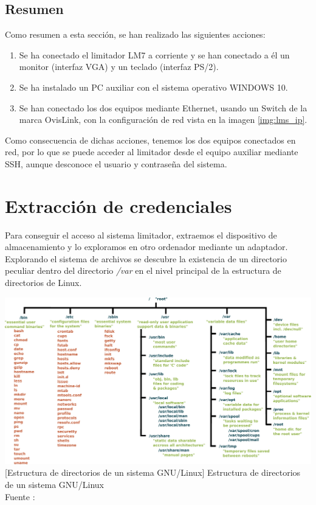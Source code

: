 \subsection{Resumen} \label{cap1:sec1:resumen}

Como resumen a esta sección, se han realizado las siguientes acciones:

\begin{enumerate}
    \item Se ha conectado el limitador \acrshort{LM7} a corriente y se han conectado a él un monitor (interfaz VGA) y un teclado (interfaz PS/2).
    \item Se ha instalado un \acrshort{PC} auxiliar con el sistema operativo \gls{WINDOWS} 10.
    \item Se han conectado los dos equipos mediante Ethernet, usando un Switch de la marca OvisLink, con la configuración de red vista en la imagen \ref{img:lms_ip}.
\end{enumerate}

Como consecuencia de dichas acciones, tenemos los dos equipos conectados en red, por lo que se puede acceder al limitador desde el equipo auxiliar mediante \acrshort{SSH}, aunque desconoce el usuario y contraseña del sistema.

\section{Extracción de credenciales} \label{lm7-credenciales}

Para conseguir el acceso al sistema limitador, extraemos el dispositivo de almacenamiento y lo exploramos en otro ordenador mediante un adaptador. Explorando el sistema de archivos se descubre la existencia de un directorio peculiar dentro del directorio \textit{/var} en el nivel principal de la estructura de directorios de Linux.

\begin{center}
    \includegraphics[scale=0.5]{figuras/unix_filesystem_hierarchy.pdf}
    [Estructura de directorios de un sistema GNU/Linux]
    {
        Estructura de directorios de un sistema \gls{GNU/Linux} \\
        Fuente : \cite{wikipedia}
    }
    \label{fig:dirs_linux}
\end{center}


